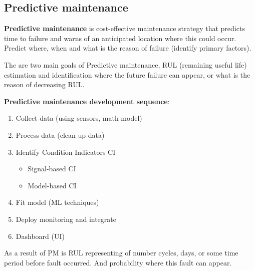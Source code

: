 \documentclass[class=article, crop=false]{standalone}
\begin{document}
% 


\subsection{Predictive maintenance}
\textbf{Predictive maintenance} is cost-effective maintenance strategy that
predicts time to failure and warns of an anticipated location where this
could occur.
Predict where, when and what is the reason of failure (identify primary
factors).

The are two main goals of Predictive maintenance, RUL (remaining useful
life) estimation and identification where the future failure can appear, or what is
the reason of decreasing RUL.


\textbf{Predictive maintenance development sequence}:
\begin{enumerate}
    \item{Collect data (using sensors, math model)}
    \item{Process data (clean up data)}
    \item{Identify Condition Indicators CI}
        \begin{itemize}
            \item{Signal-based CI}
            \item{Model-based CI}
        \end{itemize}
    \item{Fit model (ML techniques)}
    \item{Deploy monitoring and integrate}
    \item{Dashboard (UI)}
\end{enumerate}

As a result of PM is RUL representing of number cycles, days, or some time
period before fault occurred. And probability where this fault can appear.
\end{document}
